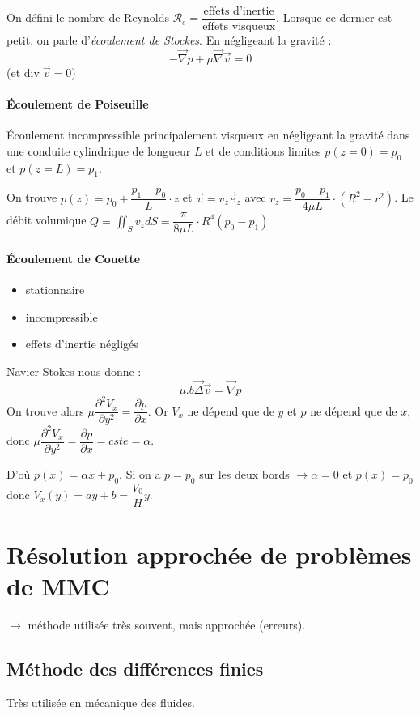\documentclass{article}
\begin{document}
On défini le nombre de Reynolds $\mathcal{R}_e = \dfrac{\text{effets d'inertie}}{\text{effets visqueux}}$. Lorsque ce dernier est petit, on parle d'\emph{écoulement de Stockes}. En négligeant la gravité :
\[-\vec{\nabla}p+\mu\vec{\nabla}\vec{v}=0\]
(et $\text{div}\; \vec{v}=0$)


\paragraph{Écoulement de Poiseuille}
Écoulement incompressible principalement visqueux en négligeant la gravité dans une conduite cylindrique de longueur $L$ et de conditions limites $p(z=0)=p_0$ et $p(z=L)=p_1$.

On trouve $p(z)= p_0 + \dfrac{p_1-p_0}{L}\cdot z$ et $\vec{v}=v_z \vec{e}_z$ avec $v_z=\dfrac{p_0-p_1}{4\mu L}\cdot (R^2-r^2)$. Le débit volumique $Q=\iint_{S} v_z dS = \dfrac{\pi}{8\mu L}\cdot R^4 (p_0-p_1)$

\paragraph{Écoulement de Couette}
\begin{itemize}[label=$\star$]
\item stationnaire
\item incompressible
\item effets d'inertie négligés
\end{itemize}

Navier-Stokes nous donne :
\[\mu.b\vec{\Delta}\vec{v} = \vec{\nabla}p\]
On trouve alors $\mu \dfrac{\partial^2 V_x}{\partial y ^2}=\dfrac{\partial p}{\partial x}$. Or $V_x$ ne dépend que de $y$ et $p$ ne dépend que de $x$, donc $\mu \dfrac{\partial^2 V_x}{\partial y ^2}=\dfrac{\partial p}{\partial x} = cste = \alpha$.

D'où $p(x) = \alpha x +p_0$. Si on a $p=p_0$ sur les deux bords $\to \alpha = 0$ et $p(x)=p_0$ donc $V_x(y)=ay+b = \dfrac{V_0}{H}y$.


\section{Résolution approchée de problèmes de MMC}
$\to$ méthode utilisée très souvent, mais approchée (erreurs).

\subsection{Méthode des différences finies}
Très utilisée en mécanique des fluides.
\end{document}
